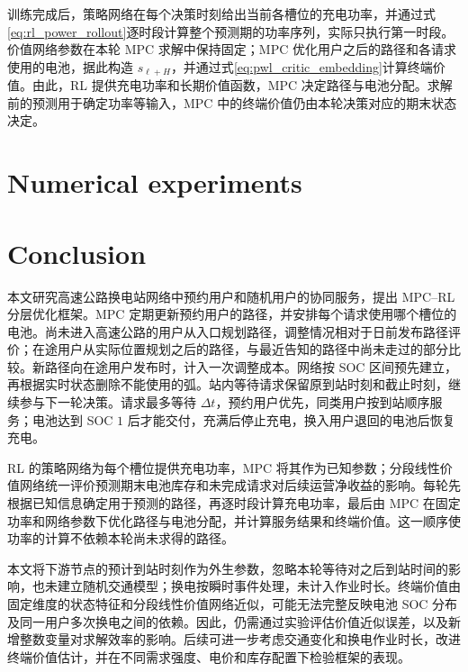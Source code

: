 \documentclass[12pt,a4paper,UTF8]{ctexart}
\begin{document}
训练完成后，策略网络在每个决策时刻给出当前各槽位的充电功率，并通过式\eqref{eq:rl_power_rollout}逐时段计算整个预测期的功率序列，实际只执行第一时段。价值网络参数在本轮 MPC 求解中保持固定；MPC 优化用户之后的路径和各请求使用的电池，据此构造 $s_{\ell+H}$，并通过式\eqref{eq:pwl_critic_embedding}计算终端价值。由此，RL 提供充电功率和长期价值函数，MPC 决定路径与电池分配。求解前的预测用于确定功率等输入，MPC 中的终端价值仍由本轮决策对应的期末状态决定。


\section{Numerical experiments}



\section{Conclusion}

本文研究高速公路换电站网络中预约用户和随机用户的协同服务，提出 MPC--RL 分层优化框架。MPC 定期更新预约用户的路径，并安排每个请求使用哪个槽位的电池。尚未进入高速公路的用户从入口规划路径，调整情况相对于日前发布路径评价；在途用户从实际位置规划之后的路径，与最近告知的路径中尚未走过的部分比较。新路径向在途用户发布时，计入一次调整成本。网络按 SOC 区间预先建立，再根据实时状态删除不能使用的弧。站内等待请求保留原到站时刻和截止时刻，继续参与下一轮决策。请求最多等待 $\Delta t$，预约用户优先，同类用户按到站顺序服务；电池达到 SOC $1$ 后才能交付，充满后停止充电，换入用户退回的电池后恢复充电。

RL 的策略网络为每个槽位提供充电功率，MPC 将其作为已知参数；分段线性价值网络统一评价预测期末电池库存和未完成请求对后续运营净收益的影响。每轮先根据已知信息确定用于预测的路径，再逐时段计算充电功率，最后由 MPC 在固定功率和网络参数下优化路径与电池分配，并计算服务结果和终端价值。这一顺序使功率的计算不依赖本轮尚未求得的路径。

本文将下游节点的预计到站时刻作为外生参数，忽略本轮等待对之后到站时间的影响，也未建立随机交通模型；换电按瞬时事件处理，未计入作业时长。终端价值由固定维度的状态特征和分段线性价值网络近似，可能无法完整反映电池 SOC 分布及同一用户多次换电之间的依赖。因此，仍需通过实验评估价值近似误差，以及新增整数变量对求解效率的影响。后续可进一步考虑交通变化和换电作业时长，改进终端价值估计，并在不同需求强度、电价和库存配置下检验框架的表现。



\end{document}
